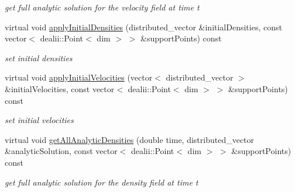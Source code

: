 \begin{DoxyCompactItemize}
\begin{DoxyCompactList}\small\item\em get full analytic solution for the velocity field at time t \end{DoxyCompactList}\item 
virtual void \hyperlink{classnatrium_1_1Benchmark_a659a0f7f17ad64f70ec843e2255f6662}{apply\-Initial\-Densities} (distributed\-\_\-vector \&initial\-Densities, const vector$<$ dealii\-::\-Point$<$ dim $>$ $>$ \&support\-Points) const 
\begin{DoxyCompactList}\small\item\em set initial densities \end{DoxyCompactList}\item 
virtual void \hyperlink{classnatrium_1_1Benchmark_a51988a00da9aa9d055e4e40815c3ee71}{apply\-Initial\-Velocities} (vector$<$ distributed\-\_\-vector $>$ \&initial\-Velocities, const vector$<$ dealii\-::\-Point$<$ dim $>$ $>$ \&support\-Points) const 
\begin{DoxyCompactList}\small\item\em set initial velocities \end{DoxyCompactList}\item 
\hypertarget{classnatrium_1_1Benchmark_af4d7fdf46dd2677d2782511b07853540}{virtual void \hyperlink{classnatrium_1_1Benchmark_af4d7fdf46dd2677d2782511b07853540}{get\-All\-Analytic\-Densities} (double time, distributed\-\_\-vector \&analytic\-Solution, const vector$<$ dealii\-::\-Point$<$ dim $>$ $>$ \&support\-Points) const }\label{classnatrium_1_1Benchmark_af4d7fdf46dd2677d2782511b07853540}

\begin{DoxyCompactList}\small\item\em get full analytic solution for the density field at time t \end{DoxyCompactList}\end{DoxyCompactItemize}


